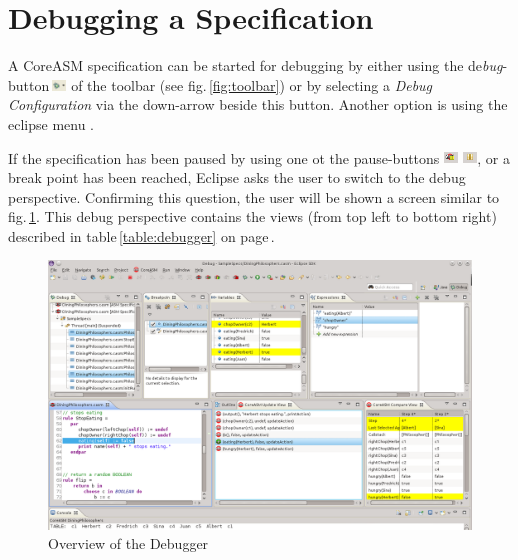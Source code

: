 \documentclass[10pt,oneside,a4paper]{article}
\begin{document}
\section{Debugging a Specification}
A CoreASM specification can be started for debugging by either using the de\emph{bug}-button\,\includegraphics[height=0.8em]{images/bug-icon.png} of the toolbar (see fig.\,\ref{fig:toolbar}) or by selecting a \emph{Debug Configuration} via the down-arrow beside this button. Another option is using the eclipse menu .

If the specification has been paused by using one ot the pause-buttons \includegraphics[height=0.8em]{images/pause-button.png} \includegraphics[height=0.8em]{images/pause-button1.png}, or a break point has been reached, Eclipse asks the user to switch to the debug perspective. Confirming this question, the user will be shown a screen similar to fig.\,\ref{fig:debugger}. This debug perspective contains the views (from top left to bottom right) described in table\,\ref{table:debugger} on page\,\pageref{table:debugger}.

\begin{figure}[h]
\centering
\includegraphics[width=.90\textwidth]{images/debugger-overview.png}
\caption{Overview of the Debugger}
\label{fig:debugger}
\end{figure}
\end{document}
